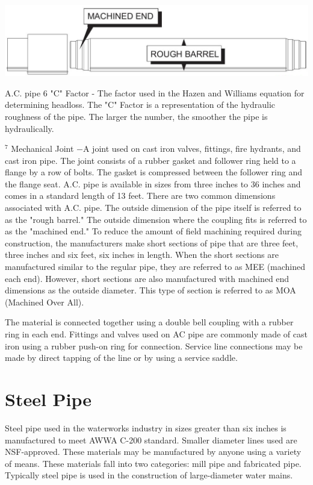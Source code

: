 \documentclass[10pt]{article}
\begin{document}
\includegraphics[max width=\textwidth]{2022_11_03_fc0cbc2f3612fab6edd2g-05(2)}

A.C. pipe 6 "C" Factor - The factor used in the Hazen and Williams equation for determining headloss. The "C" Factor is a representation of the hydraulic roughness of the pipe. The larger the number, the smoother the pipe is hydraulically.

${ }^{7}$ Mechanical Joint $-\mathrm{A}$ joint used on cast iron valves, fittings, fire hydrants, and cast iron pipe. The joint consists of a rubber gasket and follower ring held to a flange by a row of bolts. The gasket is compressed between the follower ring and the flange seat. A.C. pipe is available in sizes from three inches to 36 inches and comes in a standard length of 13 feet. There are two common dimensions associated with A.C. pipe. The outside dimension of the pipe itself is referred to as the "rough barrel." The outside dimension where the coupling fits is referred to as the "machined end." To reduce the amount of field machining required during construction, the manufacturers make short sections of pipe that are three feet, three inches and six feet, six inches in length. When the short sections are manufactured similar to the regular pipe, they are referred to as MEE (machined each end). However, short sections are also manufactured with machined end dimensions as the outside diameter. This type of section is referred to as MOA (Machined Over All).

The material is connected together using a double bell coupling with a rubber ring in each end. Fittings and valves used on AC pipe are commonly made of cast iron using a rubber push-on ring for connection. Service line connections may be made by direct tapping of the line or by using a service saddle.

\section{Steel Pipe}
Steel pipe used in the waterworks industry in sizes greater than six inches is manufactured to meet AWWA C-200 standard. Smaller diameter lines used are NSF-approved. These materials may be manufactured by anyone using a variety of means. These materials fall into two categories: mill pipe and fabricated pipe. Typically steel pipe is used in the construction of large-diameter water mains.
\end{document}
